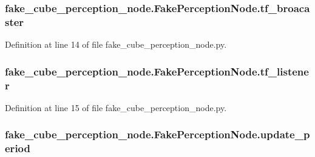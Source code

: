 \subsubsection[{\texorpdfstring{tf\+\_\+broacaster}{tf_broacaster}}]{\setlength{\rightskip}{0pt plus 5cm}fake\+\_\+cube\+\_\+perception\+\_\+node.\+Fake\+Perception\+Node.\+tf\+\_\+broacaster}\hypertarget{classfake__cube__perception__node_1_1FakePerceptionNode_a6f4046762e6ee49202366e4df6a2a60c}{}\label{classfake__cube__perception__node_1_1FakePerceptionNode_a6f4046762e6ee49202366e4df6a2a60c}


Definition at line 14 of file fake\+\_\+cube\+\_\+perception\+\_\+node.\+py.

\subsubsection[{\texorpdfstring{tf\+\_\+listener}{tf_listener}}]{\setlength{\rightskip}{0pt plus 5cm}fake\+\_\+cube\+\_\+perception\+\_\+node.\+Fake\+Perception\+Node.\+tf\+\_\+listener}\hypertarget{classfake__cube__perception__node_1_1FakePerceptionNode_a8e6364816c392f5118ad16c794adc142}{}\label{classfake__cube__perception__node_1_1FakePerceptionNode_a8e6364816c392f5118ad16c794adc142}


Definition at line 15 of file fake\+\_\+cube\+\_\+perception\+\_\+node.\+py.

\subsubsection[{\texorpdfstring{update\+\_\+period}{update_period}}]{\setlength{\rightskip}{0pt plus 5cm}fake\+\_\+cube\+\_\+perception\+\_\+node.\+Fake\+Perception\+Node.\+update\+\_\+period}\hypertarget{classfake__cube__perception__node_1_1FakePerceptionNode_a3df1532cfe1c0b4ed99346a498150c73}{}\label{classfake__cube__perception__node_1_1FakePerceptionNode_a3df1532cfe1c0b4ed99346a498150c73}


